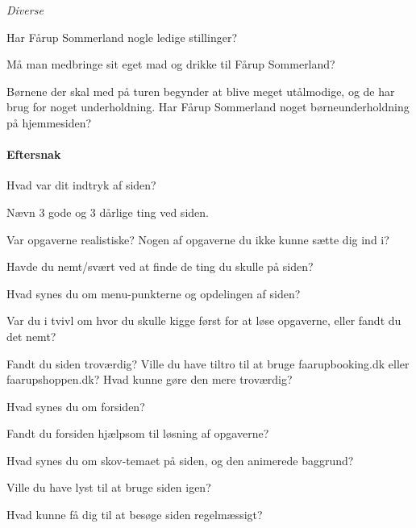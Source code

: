 \documentclass[10pt,a4paper]{article}      %
\begin{document}
\begin{opgaver}
\item {\it Diverse}
    \begin{opgaver}
    \item Har Fårup Sommerland nogle ledige stillinger?
    \item Må man medbringe sit eget mad og drikke til Fårup Sommerland?
    \item Børnene der skal med på turen begynder at blive meget utålmodige, og
    de har brug for noget underholdning. Har Fårup Sommerland noget
    børneunderholdning på hjemmesiden?
    \end{opgaver}
\end{opgaver}

\paragraph{Eftersnak}
\begin{opgaver}
\item Hvad var dit indtryk af siden?
\item Nævn 3 gode og 3 dårlige ting ved siden.
\item Var opgaverne realistiske? Nogen af opgaverne du ikke kunne sætte dig ind i?
\item Havde du nemt/svært ved at finde de ting du skulle på siden?
\item Hvad synes du om menu-punkterne og opdelingen af siden?
\item Var du i tvivl om hvor du skulle kigge først for at løse opgaverne, eller fandt du det nemt?
\item Fandt du siden troværdig? Ville du have tiltro til at bruge faarupbooking.dk eller faarupshoppen.dk? Hvad kunne gøre den mere troværdig?
\item Hvad synes du om forsiden?
\item Fandt du forsiden hjælpsom til løsning af opgaverne?
\item Hvad synes du om skov-temaet på siden, og den animerede baggrund?
\item Ville du have lyst til at bruge siden igen?
\item Hvad kunne få dig til at besøge siden regelmæssigt?
\end{opgaver}
\end{document}
